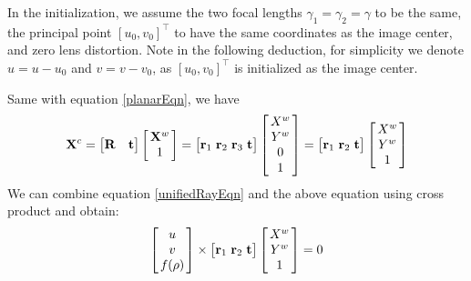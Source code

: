 \documentclass{report}
\begin{document}
In the initialization, we assume the two focal lengths $\gamma_1 = \gamma_2 = \gamma$ to be the same, the principal point $[u_0, v_0]^\top$ to have the same coordinates as the image center, and zero lens distortion. Note in the following deduction, for simplicity we denote $u = u - u_0$ and $v = v - v_0$, as $[u_0, v_0]^\top$ is initialized as the image center. 

Same with equation \ref{planarEqn}, we have
\begin{equation}
\mathbf{X}^c = 
\begin{bmatrix}
\mathbf{R} & \mathbf{t}
\end{bmatrix}
\arraycolsep=1.5pt%
\begin{bmatrix}
	\begin{array}{c}
	\mathbf{X}^w \\ 1
	\end{array}
\end{bmatrix}
= 
\begin{bmatrix}
\mathbf{r}_1 & \mathbf{r}_2 & \mathbf{r}_3 & \mathbf{t}
\end{bmatrix}
\arraycolsep=1.5pt%
\begin{bmatrix}
	\begin{array}{c}
	X^w \\ Y^w \\ 0 \\ 1
	\end{array}
\end{bmatrix}
= 
\begin{bmatrix}
\mathbf{r}_1 & \mathbf{r}_2 & \mathbf{t}
\end{bmatrix}
\arraycolsep=1.5pt%
\begin{bmatrix}
	\begin{array}{c}
	X^w \\ Y^w \\ 1
	\end{array}
\end{bmatrix}
\label{planarEqn}
\end{equation}
We can combine equation \ref{unifiedRayEqn} and the above equation using cross product and obtain: 
\begin{equation}
\arraycolsep=1.5pt%
\begin{bmatrix}
	\begin{array}{c}
	u\\ v \\ f(\rho)
	\end{array}
\end{bmatrix} 
\times
\begin{bmatrix}
\mathbf{r}_1 & \mathbf{r}_2 & \mathbf{t}
\end{bmatrix}
\arraycolsep=1.5pt%
\begin{bmatrix}
	\begin{array}{c}
	X^w \\ Y^w \\ 1
	\end{array}
\end{bmatrix}
= 0
\label{initEqn}
\end{equation}
\end{document}
